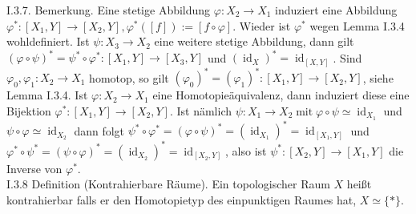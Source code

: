 \documentclass[10pt]{article}
\begin{document}
I.3.7. Bemerkung. Eine stetige Abbildung $\varphi: X_{2} \rightarrow X_{1}$ induziert eine Abbildung $\varphi^{*}:\left[X_{1}, Y\right] \rightarrow\left[X_{2}, Y\right], \varphi^{*}([f]):=[f \circ \varphi]$. Wieder ist $\varphi^{*}$ wegen Lemma I.3.4 wohldefiniert. Ist $\psi: X_{3} \rightarrow X_{2}$ eine weitere stetige Abbildung, dann gilt $(\varphi \circ \psi)^{*}=\psi^{*} \circ \varphi^{*}:\left[X_{1}, Y\right] \rightarrow\left[X_{3}, Y\right]$ und $\left(\operatorname{id}_{X}\right)^{*}=\operatorname{id}_{[X, Y]}$. Sind $\varphi_{0}, \varphi_{1}: X_{2} \rightarrow X_{1}$ homotop, so gilt $\left(\varphi_{0}\right)^{*}=\left(\varphi_{1}\right)^{*}:\left[X_{1}, Y\right] \rightarrow\left[X_{2}, Y\right]$, siehe Lemma I.3.4. Ist $\varphi: X_{2} \rightarrow X_{1}$ eine Homotopieäquivalenz, dann induziert diese eine Bijektion $\varphi^{*}:\left[X_{1}, Y\right] \rightarrow\left[X_{2}, Y\right]$. Ist nämlich $\psi: X_{1} \rightarrow X_{2} \operatorname{mit} \varphi \circ \psi \simeq \operatorname{id}_{X_{1}}$ und $\psi \circ \varphi \simeq \operatorname{id}_{X_{2}}$ dann folgt $\psi^{*} \circ \varphi^{*}=(\varphi \circ \psi)^{*}=\left(\operatorname{id}_{X_{1}}\right)^{*}=\operatorname{id}_{\left[X_{1}, Y\right]}$ und $\varphi^{*} \circ \psi^{*}=(\psi \circ \varphi)^{*}=\left(\operatorname{id}_{X_{2}}\right)^{*}=\operatorname{id}_{\left[X_{2}, Y\right]}$, also ist $\psi^{*}:\left[X_{2}, Y\right] \rightarrow\left[X_{1}, Y\right]$ die Inverse von $\varphi^{*}$.\\
I.3.8 Definition (Kontrahierbare Räume). Ein topologischer Raum $X$ heißt kontrahierbar falls er den Homotopietyp des einpunktigen Raumes hat, $X \simeq\{*\}$.
\end{document}
